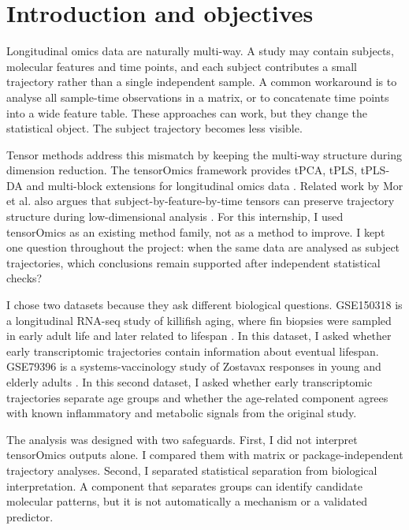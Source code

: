 \documentclass[11pt,a4paper]{article}
\begin{document}
\section{Introduction and objectives}

Longitudinal omics data are naturally multi-way. A study may contain subjects, molecular features and time points, and each subject contributes a small trajectory rather than a single independent sample. A common workaround is to analyse all sample-time observations in a matrix, or to concatenate time points into a wide feature table. These approaches can work, but they change the statistical object. The subject trajectory becomes less visible.

Tensor methods address this mismatch by keeping the multi-way structure during dimension reduction. The tensorOmics framework provides tPCA, tPLS, tPLS-DA and multi-block extensions for longitudinal omics data \citep{kodikara2026tensoromics}. Related work by Mor et al. also argues that subject-by-feature-by-time tensors can preserve trajectory structure during low-dimensional analysis \citep{mor2022tensor}. For this internship, I used tensorOmics as an existing method family, not as a method to improve. I kept one question throughout the project: when the same data are analysed as subject trajectories, which conclusions remain supported after independent statistical checks?

I chose two datasets because they ask different biological questions. GSE150318 is a longitudinal RNA-seq study of killifish aging, where fin biopsies were sampled in early adult life and later related to lifespan \citep{baumgart2016killifish}. In this dataset, I asked whether early transcriptomic trajectories contain information about eventual lifespan. GSE79396 is a systems-vaccinology study of Zostavax responses in young and elderly adults \citep{li2017vaccine}. In this second dataset, I asked whether early transcriptomic trajectories separate age groups and whether the age-related component agrees with known inflammatory and metabolic signals from the original study.

The analysis was designed with two safeguards. First, I did not interpret tensorOmics outputs alone. I compared them with matrix or package-independent trajectory analyses. Second, I separated statistical separation from biological interpretation. A component that separates groups can identify candidate molecular patterns, but it is not automatically a mechanism or a validated predictor.
\end{document}
